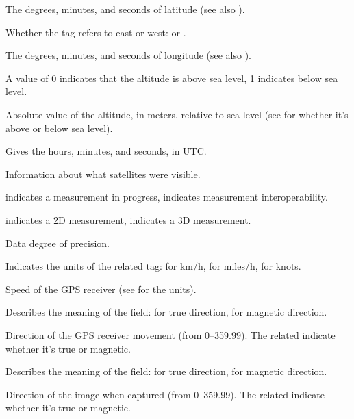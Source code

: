 The degrees, minutes, and seconds of latitude (see also ).
\apiend

Whether the  tag refers to east or west:  or 
.
\apiend

The degrees, minutes, and seconds of longitude (see also 
).
\apiend

A value of 0 indicates that the altitude is above sea level, 1 indicates
below sea level.
\apiend

Absolute value of the altitude, in meters, relative to sea level 
(see  for whether it's above or below sea level).
\apiend

Gives the hours, minutes, and seconds, in UTC.
\apiend

Information about what satellites were visible.
\apiend

 indicates a measurement in progress,  indicates
measurement interoperability.
\apiend

 indicates a 2D measurement,  indicates a 3D measurement.
\apiend

Data degree of precision.
\apiend

Indicates the units of the related  tag: 
 for km/h,  for miles/h,  for knots.
\apiend

Speed of the GPS receiver (see  for the units).
\apiend

Describes the meaning of the  field:  for true
direction,  for magnetic direction.
\apiend

Direction of the GPS receiver movement (from 0--359.99).  The
related  indicate whether it's true or magnetic.
\apiend

Describes the meaning of the  field:  for true
direction,  for magnetic direction.
\apiend

Direction of the image when captured (from 0--359.99).  The
related  indicate whether it's true or magnetic.

